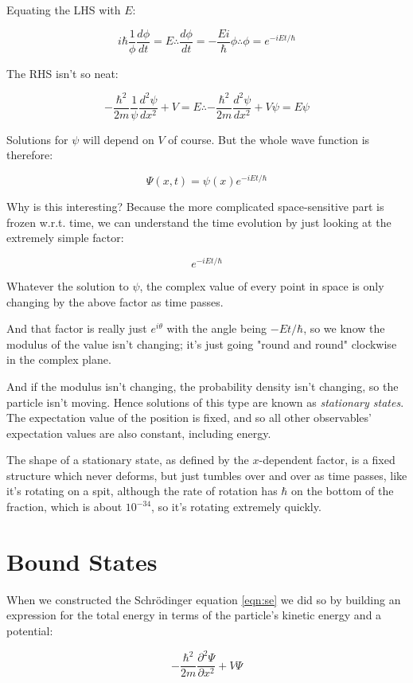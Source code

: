 Equating the LHS with $E$:

$$
i\hbar
\frac{1}{\phi}
\frac{d \phi}{d t}
= E
\therefore
\frac{d \phi}{d t}
=
- \frac{Ei}{\hbar}
\phi
\therefore
\phi = e^{-iEt/\hbar}
$$

The RHS isn't so neat:

$$
- \frac{\hbar^2}{2m}
\frac{1}{\psi}
\frac{d^2 \psi}{d x^2}
+ V
=
E
\therefore
- \frac{\hbar^2}{2m}
\frac{d^2 \psi}{d x^2}
+ V\psi
=
E\psi
$$

Solutions for $\psi$ will depend on $V$ of course. But the whole wave function is therefore:

$$\Psi(x, t) = \psi(x) e^{-iEt/\hbar}$$

Why is this interesting? Because the more complicated space-sensitive part is frozen w.r.t. time, we can understand the time evolution by just looking at the extremely simple factor:

$$
e^{-iEt/\hbar}
$$

Whatever the solution to $\psi$, the complex value of every point in space is only changing by the above factor as time passes.

And that factor is really just $e^{i\theta}$ with the angle being $-Et/\hbar$, so we know the modulus of the value isn't changing; it's just going "round and round" clockwise in the complex plane.

And if the modulus isn't changing, the probability density isn't changing, so the particle isn't moving. Hence solutions of this type are known as \textit{stationary states}. The expectation value of the position is fixed, and so all other observables' expectation values are also constant, including energy.

The shape of a stationary state, as defined by the $x$-dependent factor, is a fixed structure which never deforms, but just tumbles over and over as time passes, like it's rotating on a spit, although the rate of rotation has $\hbar$ on the bottom of the fraction, which is about $10^{-34}$, so it's rotating extremely quickly.

\section{Bound States}

When we constructed the Schrödinger equation \eqref{eqn:se} we did so by building an expression for the total energy in terms of the particle's kinetic energy and a potential:

$$
- \frac{\hbar^2}{2m} \frac{\partial^2 \Psi}{\partial x^2} + V{\Psi}
$$  

